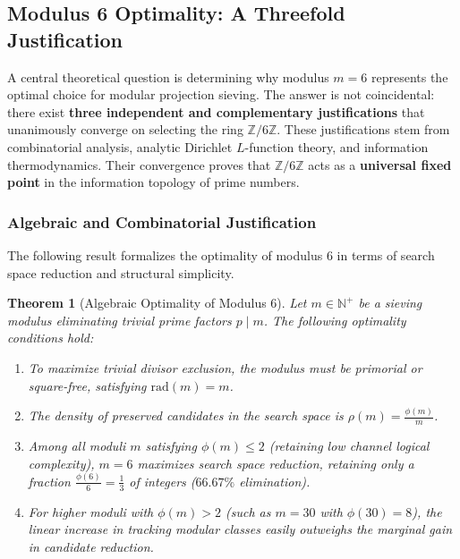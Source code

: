 \documentclass{article}
\numberwithin{equation}{section}
\theoremstyle{plain}
\newtheorem{theorem}{Theorem}[section]
\theoremstyle{definition}
\begin{document}

\subsection{Modulus 6 Optimality: A Threefold Justification}
\label{subsec:optimalidad-modulo6}

A central theoretical question is determining why modulus $m = 6$ represents the optimal choice for modular projection sieving. The answer is not coincidental: there exist \textbf{three independent and complementary justifications} that unanimously converge on selecting the ring $\mathbb{Z}/6\mathbb{Z}$. These justifications stem from combinatorial analysis, analytic Dirichlet $L$-function theory, and information thermodynamics. Their convergence proves that $\mathbb{Z}/6\mathbb{Z}$ acts as a \textbf{universal fixed point} in the information topology of prime numbers.

\subsubsection{Algebraic and Combinatorial Justification}

The following result formalizes the optimality of modulus 6 in terms of search space reduction and structural simplicity.

\begin{theorem}[Algebraic Optimality of Modulus 6]
\label{thm:optimalidad-algebraica}
Let $m \in \mathbb{N}^+$ be a sieving modulus eliminating trivial prime factors $p \mid m$. The following optimality conditions hold:
\begin{enumerate}
    \item To maximize trivial divisor exclusion, the modulus must be primorial or square-free, satisfying $\mathrm{rad}(m) = m$.
    \item The density of preserved candidates in the search space is $\rho(m) = \frac{\phi(m)}{m}$.
    \item Among all moduli $m$ satisfying $\phi(m) \le 2$ (retaining low channel logical complexity), $m = 6$ maximizes search space reduction, retaining only a fraction $\frac{\phi(6)}{6} = \frac{1}{3}$ of integers ($66.67\%$ elimination).
    \item For higher moduli with $\phi(m) > 2$ (such as $m=30$ with $\phi(30)=8$), the linear increase in tracking modular classes easily outweighs the marginal gain in candidate reduction.
\end{enumerate}
\end{theorem}
\end{document}

